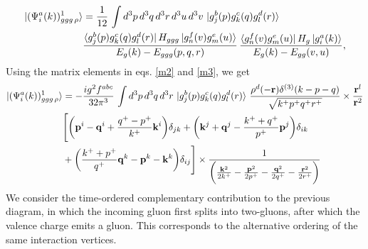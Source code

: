\documentclass[a4paper,11pt]{article}
\def\v#1{\mathbf{#1}}
\begin{document}
\begin{figure}[htbp]
    \centering
\end{figure}
\begin{align}
   \ket{(\Psi^{a}_{i}(k))^{1}_{ggg\,\rho}} & = \frac{1}{12}\, \int d^{3}p \, d^{3}q \, d^{3}r \, d^{3}u \, d^{3}v\, \ket{g^{b}_{j}(p)g^{c}_{k}(q)g^{d}_{l}(r)} \notag \\  & \frac{\bra{g^{b}_{j}(p)g^{c}_{k}(q)g^{d}_{l}(r)}H_{ggg}\ket{g^{f}_{n}(v)g^{e}_{m}(u)}}{E_{g}(k)-E_{ggg}(p,q,r)}\,\frac{\bra{g^{f}_{n}(v)g^{e}_{m}(u)}H_{g}\ket{g^{a}_{i}(k)}}{E_{g}(k)-E_{gg}(v,u)}, 
\end{align}
Using the matrix elements in eqs. \eqref{m2} and \eqref{m3}, we get
 \begin{align}
     \ket{(\Psi^{a}_{i}(k))^{1}_{ggg\,\rho}} & = -\frac{ig^{2}f^{abc}}{32\pi^{3}}\,\int d^{3}p \, d^{3}q \, d^{3}r \, \ket{g^{b}_{j}(p)g^{c}_{k}(q)g^{d}_{l}(r)}\, \frac{\rho^{d}(-\v{r})\delta^{(3)}(k-p-q)}{\sqrt{k^{+}p^{+}q^{+}r^{+}}}\times \frac{\v{r}^{l}}{\v{r}^{2}}\notag \\ &  \Bigg[\bigg(\v{p}^{i}-\v{q}^{i}+\frac{q^{+}-p^{+}}{k^{+}}\v{k}^{i}\bigg)\delta_{jk} +\bigg(\v{k}^{j}+\v{q}^{j}-\frac{k^{+}+q^{+}}{p^{+}}\v{p}^{j}\bigg)\delta_{ik} \notag \\ & +\bigg(\frac{k^{+}+p^{+}}{q^{+}}\v{q}^{k}-\v{p}^{k}-\v{k}^{k}\bigg)\delta_{ij}\Bigg]  \times \frac{1}{\bigg(\frac{\v{k}^{2}}{2k^{+}}-\frac{\v{p}^{2}}{2p^{+}}-\frac{\v{q}^{2}}{2q^{+}}-\frac{\v{r}^{2}}{2r^{+}}\bigg)}
 \end{align}
We consider the time-ordered complementary contribution to the previous diagram, in which the incoming gluon first splits into two-gluons, after which the valence charge emits a gluon. This corresponds to the alternative ordering of the same interaction vertices.
\end{document}
